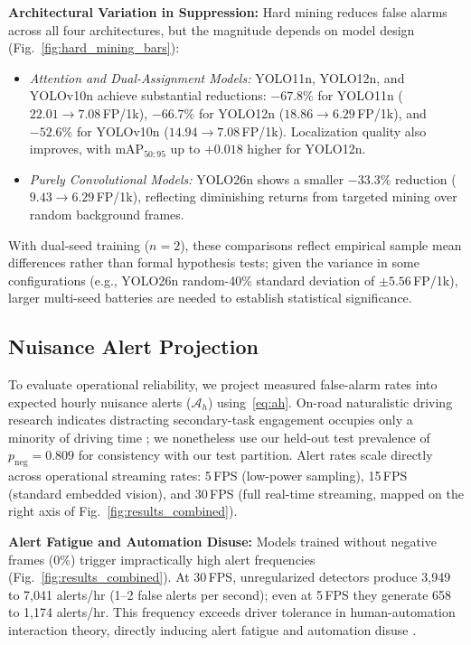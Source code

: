 \documentclass[conference]{IEEEtran}
\begin{document}
\textbf{Architectural Variation in Suppression:} Hard mining reduces false alarms across all four architectures, but the magnitude depends on model design (Fig.~\ref{fig:hard_mining_bars}):
\begin{itemize}
    \item \textit{Attention and Dual-Assignment Models:} YOLO11n, YOLO12n, and YOLOv10n achieve substantial reductions: $-67.8\%$ for YOLO11n ($22.01 \to 7.08$\,FP/1k), $-66.7\%$ for YOLO12n ($18.86 \to 6.29$\,FP/1k), and $-52.6\%$ for YOLOv10n ($14.94 \to 7.08$\,FP/1k). Localization quality also improves, with $\text{mAP}_{50:95}$ up to $+0.018$ higher for YOLO12n.
    \item \textit{Purely Convolutional Models:} YOLO26n shows a smaller $-33.3\%$ reduction ($9.43 \to 6.29$\,FP/1k), reflecting diminishing returns from targeted mining over random background frames.
\end{itemize}
With dual-seed training ($n=2$), these comparisons reflect empirical sample mean differences rather than formal hypothesis tests; given the variance in some configurations (e.g., YOLO26n random-40\% standard deviation of $\pm 5.56$\,FP/1k), larger multi-seed batteries are needed to establish statistical significance.


\subsection{Nuisance Alert Projection} \label{subsec:results_nuisance} To evaluate operational reliability, we project measured false-alarm rates into expected hourly nuisance alerts ($\mathcal{A}_h$) using~\eqref{eq:ah}. On-road naturalistic driving research indicates distracting secondary-task engagement occupies only a minority of driving time \cite{stutts2005}; we nonetheless use our held-out test prevalence of $p_{\mathrm{neg}} = 0.809$ for consistency with our test partition. Alert rates scale directly across operational streaming rates: 5\,FPS (low-power sampling), 15\,FPS (standard embedded vision), and 30\,FPS (full real-time streaming, mapped on the right axis of Fig.~\ref{fig:results_combined}).
 

\textbf{Alert Fatigue and Automation Disuse:} Models trained without negative frames (0\%) trigger impractically high alert frequencies (Fig.~\ref{fig:results_combined}). At 30\,FPS, unregularized detectors produce 3{,}949 to 7{,}041 alerts/hr (1--2 false alerts per second); even at 5\,FPS they generate 658 to 1{,}174 alerts/hr. This frequency exceeds driver tolerance in human-automation interaction theory, directly inducing alert fatigue and automation disuse \cite{lambert2026chinese, parasuraman1997humans}.
\end{document}

